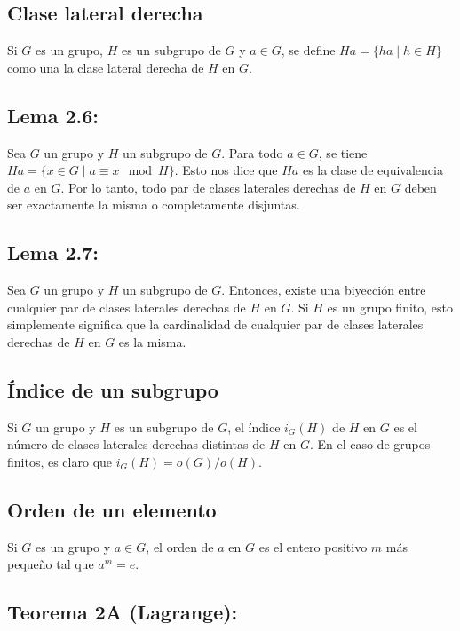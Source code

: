 \documentclass{article}
\begin{document}
\subsection*{\color{violet} Clase lateral derecha}

Si $G$ es un grupo, $H$ es un subgrupo de $G$ y $a\in G$, se define $Ha=\{ha\mid h\in H\}$ como una la clase lateral derecha de $H$ en $G$.

\subsection*{\color{blue} Lema 2.6:}

Sea $G$ un grupo y $H$ un subgrupo de $G$. Para todo $a\in G$, se tiene $Ha=\{x\in G\mid a\equiv x\mod H\}$. Esto nos dice que $Ha$ es la clase de equivalencia de $a$ en $G$. Por lo tanto, todo par de clases laterales derechas de $H$ en $G$ deben ser exactamente la misma o completamente disjuntas. 

\subsection*{\color{blue} Lema 2.7:}

Sea $G$ un grupo y $H$ un subgrupo de $G$. Entonces, existe una biyección entre cualquier par de clases laterales derechas de $H$ en $G$. Si $H$ es un grupo finito, esto simplemente significa que la cardinalidad de cualquier par de clases laterales derechas de $H$ en $G$ es la misma.

\subsection*{\color{violet} Índice de un subgrupo}

Si $G$ un grupo y $H$ es un subgrupo de $G$, el índice $i_G(H)$ de $H$ en $G$ es el número de clases laterales derechas distintas de $H$ en $G$. En el caso de grupos finitos, es claro que $i_G(H)=o(G)/o(H)$.

\subsection*{\color{violet} Orden de un elemento}

Si $G$ es un grupo y $a\in G$, el orden de $a$ en $G$ es el entero positivo $m$ más pequeño tal que $a^m=e$.

\subsection*{\color{red} Teorema 2A (Lagrange):}
\end{document}
